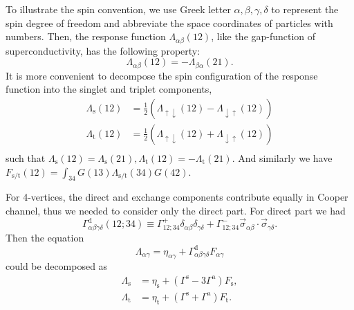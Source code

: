 \documentclass[%
 reprint,
superscriptaddress,
 amsmath,amssymb,
 aps,
prx,
]{revtex4-2}
\newcommand{\txa}{\text{a}}
\newcommand{\txd}{\text{d}}
\newcommand{\txs}{\text{s}}
\newcommand{\txt}{\text{t}}
\newcommand{\pcf}{\Lambda} %
\begin{document}
\begin{appendices}
To illustrate the spin convention, we use Greek letter $\alpha,\beta,\gamma,\delta$ to represent the spin degree of freedom and abbreviate the space coordinates of particles with numbers. Then, the response function $\pcf_{\alpha\beta}(12)$, like the gap-function of
superconductivity, has the following property:
\begin{equation}
  \pcf_{\alpha\beta}(12) = -\pcf_{\beta\alpha}(21).
\end{equation}
It is more convenient to decompose the spin configuration of the response
function into the singlet and triplet components, 
\begin{equation}
  \begin{split}
    \pcf_{\txs}(12) &= \frac{1}{2}(\pcf_{\uparrow\downarrow}(12)-\pcf_{\downarrow\uparrow}(12))\\
    \pcf_{\txt}(12) &= \frac{1}{2}(\pcf_{\uparrow\downarrow}(12)+\pcf_{\downarrow\uparrow}(12))\\
  \end{split}
\end{equation}
such that
$\pcf_{\txs}(12) = \pcf_{\txs}(21),\pcf_{\txt}(12) = -\pcf_{\txt}(21)$.
And similarly we have $F_{\txs/\txt}(12)=\int_{34}G(13)\pcf_{\txs/\txt}(34)G(42)$.

For 4-vertices, the direct and exchange components contribute equally in Cooper
channel, thus we needed to consider only the direct part. For direct part we had
\begin{equation}
  \Gamma^\txd_{\alpha\beta\gamma\delta}(12;34) \equiv \Gamma^{+}_{12;34}\delta_{\alpha\beta}\delta_{\gamma\delta} + \Gamma^{-}_{12;34} \vec{\sigma}_{\alpha\beta}\cdot \vec{\sigma}_{\gamma\delta}.
\end{equation}
Then the equation
\begin{equation}
  \pcf_{\alpha\gamma} = \eta_{\alpha\gamma} + \Gamma^\txd_{\alpha\beta\gamma\delta} F_{\alpha\gamma}
\end{equation}
could be decomposed as
\begin{equation}
  \begin{split}
    \pcf_\txs &= \eta_\txs + (\Gamma^\txs-3\Gamma^\txa)F_\txs, \\
    \pcf_\txt &= \eta_\txt + (\Gamma^\txs+\Gamma^\txa)F_\txt. \\
  \end{split}
\end{equation}


\end{appendices}
\end{document}
